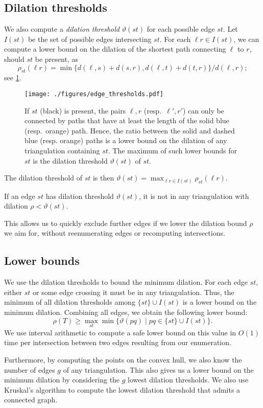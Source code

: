 \subsection{Dilation thresholds}
We also compute a \emph{dilation threshold} $\vartheta(st)$ for each possible edge $st$.
Let $I(st)$ be the set of possible edges intersecting $st$.
For each $\ell r \in I(st)$, we can compute a lower bound on the dilation of the 
shortest path connecting $\ell$ to $r$, should $st$ be present, as \[\rho_{st}(\ell r) = \min \{d(\ell,s) + d(s,r), d(\ell,t) + d(t,r)\}/d(\ell,r);\]
see \cref{fig:dilation-thresholds}.
\begin{figure}
  \centering
  \texttt{[image: ./figures/edge\_thresholds.pdf]}
  \caption{If $st$ (black) is present, the pairs $\ell, r$ (resp.\ $\ell',r'$)
           can only be connected by paths that have at least the length of the solid blue (resp.\ orange) path.
           Hence, the ratio between the solid and dashed blue (resp. orange) paths is a lower bound on the dilation of any triangulation containing $st$.
           The maximum of such lower bounds for $st$ is the dilation threshold $\vartheta(st)$ of $st$.}
  \label{fig:dilation-thresholds}
\end{figure}
The dilation threshold of $st$ is then $\vartheta(st) = \max_{\ell r \in I(st)} \rho_{st}(\ell r)$.
\begin{observation}
  If an edge $st$ has dilation threshold $\vartheta(st)$, it is not
  in any triangulation with dilation $\rho < \vartheta(st)$.
\end{observation}
This allows us to quickly exclude further edges if we lower the dilation bound $\rho$ we aim for,
without reenumerating edges or recomputing intersections.

\subsection{Lower bounds}
We use the dilation thresholds to bound the minimum dilation.
For each edge $st$, either $st$ or some edge crossing it must be in any triangulation.
Thus, the minimum of all dilation thresholds among $\{st\} \cup I(st)$ is a lower bound on the minimum dilation.
Combining all edges, we obtain the following lower bound:
\[\rho(T) \geq \max_{st} \min \{\vartheta(pq) \mid pq \in \{st\} \cup I(st) \}.\]
We use interval arithmetic to compute a safe lower bound on this value in $O(1)$ time per intersection between two edges resulting from our enumeration.

Furthermore, by computing the points on the convex hull, we also know the number of edges $g$ of any triangulation.
This also gives us a lower bound on the minimum dilation by considering the $g$ lowest dilation thresholds. 
We also use Kruskal's algorithm to compute the lowest dilation threshold that admits a connected graph.
